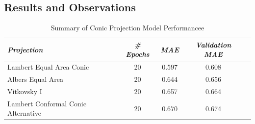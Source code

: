 \subsection{Results and Observations}

\begin{table}[ht]
    \centering
    \caption{Summary of Conic Projection Model Performancee}
    \label{conic_results_table}
    \renewcommand{\arraystretch}{1.2} %
    \begin{tabular}{|l|c|c|c|c|}
        \hline
        \rowcolor[gray]{0.9}
        \textbf{\emph{Projection}}          & \textbf{\emph{\# Epochs}} & \textbf{\emph{MAE}} & \textbf{\emph{Validation MAE}} \\ \hline
        Lambert Equal Area Conic            & 20                        & 0.597               & 0.608                          \\ \hline
        Albers Equal Area                   & 20                        & 0.644               & 0.656                          \\ \hline
        Vitkovsky I                         & 20                        & 0.657               & 0.664                          \\ \hline
        Lambert Conformal Conic Alternative & 20                        & 0.670               & 0.674                          \\ \hline
    \end{tabular}
\end{table}